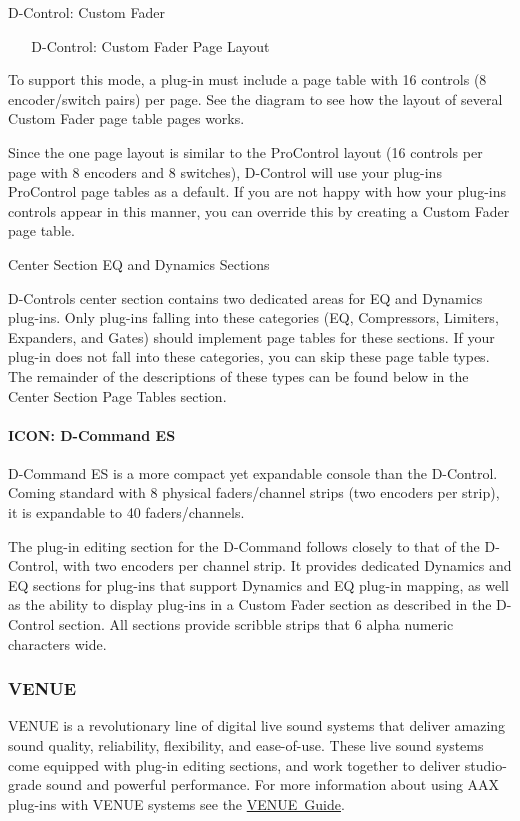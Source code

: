 \begin{DoxyItemize}
  D-\/\+Control\+: Custom Fader 

~ ~   D-\/\+Control\+: Custom Fader Page Layout  

To support this mode, a plug-\/in must include a page table with 16 controls (8 encoder/switch pairs) per page. See the diagram to see how the layout of several Custom Fader page table pages works.

Since the one page layout is similar to the Pro\+Control layout (16 controls per page with 8 encoders and 8 switches), D-\/\+Control will use your plug-\/in\textquotesingle{}s Pro\+Control page tables as a default. If you are not happy with how your plug-\/ins controls appear in this manner, you can override this by creating a Custom Fader page table.


\item Center Section EQ and Dynamics Sections

D-\/\+Control\textquotesingle{}s center section contains two dedicated areas for EQ and Dynamics plug-\/ins. Only plug-\/ins falling into these categories (EQ, Compressors, Limiters, Expanders, and Gates) should implement page tables for these sections. If your plug-\/in does not fall into these categories, you can skip these page table types. The remainder of the descriptions of these types can be found below in the Center Section Page Tables section.  
\end{DoxyItemize}

\hypertarget{a00833_subsubsection__icon_dcommand_es_}{}\paragraph{I\+C\+O\+N\+: D-\/\+Command ES}\label{a00833_subsubsection__icon_dcommand_es_}
 D-\/\+Command ES is a more compact yet expandable console than the D-\/\+Control. Coming standard with 8 physical faders/channel strips (two encoders per strip), it is expandable to 40 faders/channels.

The plug-\/in editing section for the D-\/\+Command follows closely to that of the D-\/\+Control, with two encoders per channel strip. It provides dedicated Dynamics and EQ sections for plug-\/ins that support Dynamics and EQ plug-\/in mapping, as well as the ability to display plug-\/ins in a Custom Fader section as described in the D-\/\+Control section. All sections provide scribble strips that 6 alpha numeric characters wide.

\hypertarget{a00833_subsection__venue}{}\subsubsection{V\+E\+N\+UE}\label{a00833_subsection__venue}
V\+E\+N\+UE is a revolutionary line of digital live sound systems that deliver amazing sound quality, reliability, flexibility, and ease-\/of-\/use. These live sound systems come equipped with plug-\/in editing sections, and work together to deliver studio-\/grade sound and powerful performance. For more information about using A\+AX plug-\/ins with V\+E\+N\+UE systems see the \mbox{\hyperlink{a00849}{V\+E\+N\+UE Guide}}.

